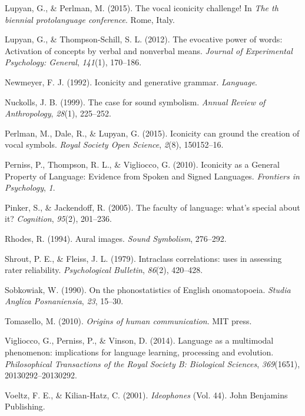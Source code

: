 \documentclass[english,floatsintext,man]{apa6}
\theoremstyle{definition}
\theoremstyle{definition}
\theoremstyle{remark}
\begin{document}
\hypertarget{ref-Lupyan:2015vic}{}
Lupyan, G., \& Perlman, M. (2015). The vocal iconicity challenge! In
\emph{The th biennial protolanguage conference}. Rome, Italy.

\hypertarget{ref-Lupyan:2012cp}{}
Lupyan, G., \& Thompson-Schill, S. L. (2012). The evocative power of
words: Activation of concepts by verbal and nonverbal means.
\emph{Journal of Experimental Psychology: General}, \emph{141}(1),
170--186.

\hypertarget{ref-Newmeyer:1992we}{}
Newmeyer, F. J. (1992). Iconicity and generative grammar.
\emph{Language}.

\hypertarget{ref-Nuckolls:1999ca}{}
Nuckolls, J. B. (1999). The case for sound symbolism. \emph{Annual
Review of Anthropology}, \emph{28}(1), 225--252.

\hypertarget{ref-Perlman:2015ip}{}
Perlman, M., Dale, R., \& Lupyan, G. (2015). Iconicity can ground the
creation of vocal symbols. \emph{Royal Society Open Science},
\emph{2}(8), 150152--16.

\hypertarget{ref-Perniss:2010fb}{}
Perniss, P., Thompson, R. L., \& Vigliocco, G. (2010). Iconicity as a
General Property of Language: Evidence from Spoken and Signed Languages.
\emph{Frontiers in Psychology}, \emph{1}.

\hypertarget{ref-Pinker:2005cv}{}
Pinker, S., \& Jackendoff, R. (2005). The faculty of language: what's
special about it? \emph{Cognition}, \emph{95}(2), 201--236.

\hypertarget{ref-Rhodes:1994au}{}
Rhodes, R. (1994). Aural images. \emph{Sound Symbolism}, 276--292.

\hypertarget{ref-Shrout:1979tg}{}
Shrout, P. E., \& Fleiss, J. L. (1979). Intraclass correlations: uses in
assessing rater reliability. \emph{Psychological Bulletin},
\emph{86}(2), 420--428.

\hypertarget{ref-Sobkowiak:1990ph}{}
Sobkowiak, W. (1990). On the phonostatistics of English onomatopoeia.
\emph{Studia Anglica Posnaniensia}, \emph{23}, 15--30.

\hypertarget{ref-Tomasello:2010or}{}
Tomasello, M. (2010). \emph{Origins of human communication}. MIT press.

\hypertarget{ref-Vigliocco:2014fc}{}
Vigliocco, G., Perniss, P., \& Vinson, D. (2014). Language as a
multimodal phenomenon: implications for language learning, processing
and evolution. \emph{Philosophical Transactions of the Royal Society B:
Biological Sciences}, \emph{369}(1651), 20130292--20130292.

\hypertarget{ref-Voeltz:2001vv}{}
Voeltz, F. E., \& Kilian-Hatz, C. (2001). \emph{Ideophones} (Vol. 44).
John Benjamins Publishing.


\clearpage
\renewcommand{\listtablename}{Table captions}
\listoftables

\clearpage
\renewcommand{\listfigurename}{Figure captions}
\listoffigures
\end{document}
